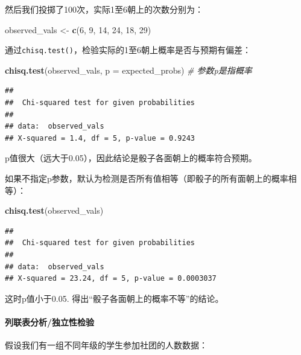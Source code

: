 \documentclass[]{book}
\newenvironment{Shaded}{\begin{snugshade}}{\end{snugshade}}
\newcommand{\CommentTok}[1]{\textcolor[rgb]{0.56,0.35,0.01}{\textit{#1}}}
\newcommand{\DataTypeTok}[1]{\textcolor[rgb]{0.13,0.29,0.53}{#1}}
\newcommand{\DecValTok}[1]{\textcolor[rgb]{0.00,0.00,0.81}{#1}}
\newcommand{\KeywordTok}[1]{\textcolor[rgb]{0.13,0.29,0.53}{\textbf{#1}}}
\newcommand{\NormalTok}[1]{#1}
\newcommand{\StringTok}[1]{\textcolor[rgb]{0.31,0.60,0.02}{#1}}
\let\oldparagraph\paragraph
\renewcommand{\paragraph}[1]{\oldparagraph{#1}\mbox{}}
\begin{document}
然后我们投掷了100次，实际1至6朝上的次数分别为：

\begin{Shaded}
\begin{Highlighting}[]
\NormalTok{observed_vals <-}\StringTok{ }\KeywordTok{c}\NormalTok{(}\DecValTok{6}\NormalTok{, }\DecValTok{9}\NormalTok{, }\DecValTok{14}\NormalTok{, }\DecValTok{24}\NormalTok{, }\DecValTok{18}\NormalTok{, }\DecValTok{29}\NormalTok{)}
\end{Highlighting}
\end{Shaded}

通过\texttt{chisq.test()}，检验实际的1至6朝上概率是否与预期有偏差：

\begin{Shaded}
\begin{Highlighting}[]
\KeywordTok{chisq.test}\NormalTok{(observed_vals, }\DataTypeTok{p =}\NormalTok{ expected_probs) }\CommentTok{# 参数p是指概率}
\end{Highlighting}
\end{Shaded}

\begin{verbatim}
## 
##  Chi-squared test for given probabilities
## 
## data:  observed_vals
## X-squared = 1.4, df = 5, p-value = 0.9243
\end{verbatim}

p值很大（远大于0.05），因此结论是骰子各面朝上的概率符合预期。

如果不指定p参数，默认为检测是否所有值相等（即骰子的所有面朝上的概率相等）：

\begin{Shaded}
\begin{Highlighting}[]
\KeywordTok{chisq.test}\NormalTok{(observed_vals)}
\end{Highlighting}
\end{Shaded}

\begin{verbatim}
## 
##  Chi-squared test for given probabilities
## 
## data:  observed_vals
## X-squared = 23.24, df = 5, p-value = 0.0003037
\end{verbatim}

这时p值小于0.05. 得出``骰子各面朝上的概率不等''的结论。

\hypertarget{chisq-contig}{%
\paragraph{列联表分析/独立性检验}\label{chisq-contig}}

假设我们有一组不同年级的学生参加社团的人数数据：
\end{document}
